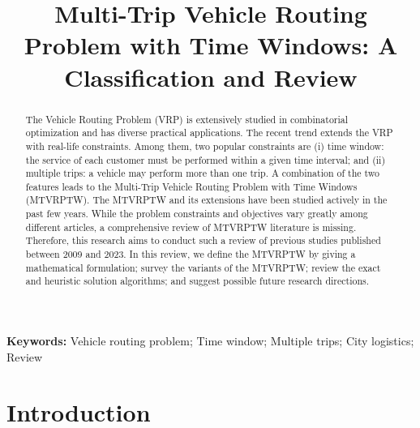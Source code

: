 \documentclass[11pt]{article}
\title{Multi-Trip Vehicle Routing Problem with Time Windows: A Classification and Review}
\begin{document}
\maketitle


\begin{abstract}
The Vehicle Routing Problem (VRP) is extensively studied in combinatorial optimization and has diverse practical applications. The recent trend extends the VRP with real-life constraints.  Among them, two popular constraints are (i) time window: the service of each customer must be performed within a given time interval; and (ii) multiple trips: a vehicle may perform more than one trip.  A combination of the two features leads to the Multi-Trip Vehicle Routing Problem with Time Windows (MTVRPTW). The MTVRPTW and its extensions have been studied actively in the past few years.  While the problem constraints and objectives vary greatly among different articles, a comprehensive review of MTVRPTW literature is missing.  Therefore, this research aims to conduct such a review of previous studies published between 2009 and 2023.  In this review, we define the MTVRPTW by giving a mathematical formulation; survey the variants of the MTVRPTW; review the exact and heuristic solution algorithms; and suggest possible future research directions.
\end{abstract}

\textbf{Keywords:} Vehicle routing problem;
Time window; 
Multiple trips;
City logistics;
Review
\maketitle

\section{Introduction}
\end{document}
